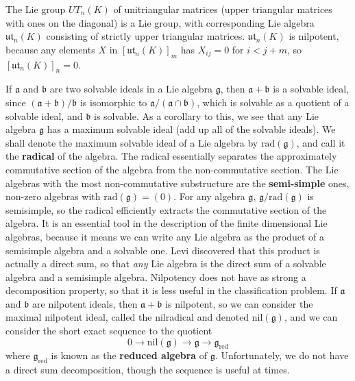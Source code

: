 \begin{example}
    The Lie group $UT_n(K)$ of unitriangular matrices (upper triangular matrices with ones on the diagonal) is a Lie group, with corresponding Lie algebra $\mathfrak{ut}_n(K)$ consisting of strictly upper triangular matrices. $\mathfrak{ut}_n(K)$ is nilpotent, because any elements $X$ in $[\mathfrak{ut}_n(K)]_m$ has $X_{ij} = 0$ for $i < j + m$, so $[\mathfrak{ut}_n(K)]_n = 0$.
\end{example}

If $\mathfrak{a}$ and $\mathfrak{b}$ are two solvable ideals in a Lie algebra $\mathfrak{g}$, then $\mathfrak{a} + \mathfrak{b}$ is a solvable ideal, since $(\mathfrak{a} + \mathfrak{b})/\mathfrak{b}$ is isomorphic to $\mathfrak{a}/(\mathfrak{a} \cap \mathfrak{b})$, which is solvable as a quotient of a solvable ideal, and $\mathfrak{b}$ is solvable. As a corollary to this, we see that any Lie algebra $\mathfrak{g}$ has a maximum solvable ideal (add up all of the solvable ideals). We shall denote the maximum solvable ideal of a Lie algebra by $\text{rad}(\mathfrak{g})$, and call it the {\bf radical} of the algebra. The radical essentially separates the approximately commutative section of the algebra from the non-commutative section. The Lie algebras with the most non-commutative substructure are the {\bf semi-simple} ones, non-zero algebras with $\text{rad}(\mathfrak{g}) = (0)$. For any algebra $\mathfrak{g}$, $\mathfrak{g}/\text{rad}(\mathfrak{g})$ is semisimple, so the radical efficiently extracts the commutative section of the algebra. It is an essential tool in the description of the finite dimensional Lie algebras, because it means we can write any Lie algebra as the product of a semisimple algebra and a solvable one. Levi discovered that this product is actually a direct sum, so that {\it any} Lie algebra is the direct sum of a solvable algebra and a semisimple algebra. Nilpotency does not have as strong a decomposition property, so that it is less useful in the classification problem. If $\mathfrak{a}$ and $\mathfrak{b}$ are nilpotent ideals, then $\mathfrak{a} + \mathfrak{b}$ is nilpotent, so we can consider the maximal nilpotent ideal, called the nilradical and denoted $\text{nil}(\mathfrak{g})$, and we can consider the short exact sequence to the quotient
%
\[ 0 \to \text{nil}(\mathfrak{g}) \to \mathfrak{g} \to \mathfrak{g}_{\text{red}} \]
%
where $\mathfrak{g}_{\text{red}}$ is known as the {\bf reduced algebra} of $\mathfrak{g}$. Unfortunately, we do not have a direct sum decomposition, though the sequence is useful at times.

